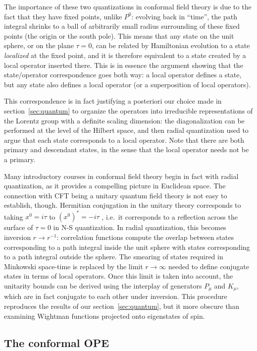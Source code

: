 \documentclass[a4paper,12pt]{article}
\numberwithin{equation}{section}
\begin{document}
The importance of these two quantizations in conformal field theory is due to the fact that they have fixed points, unlike $P^0$: evolving back in ``time'', the path integral shrinks to a ball of arbitrarily small radius surrounding of these fixed points (the origin or the south pole). This means that any state on the unit sphere, or on the plane $\tau = 0$, can be related by Hamiltonian evolution to a state \emph{localized} at the fixed point, and it is therefore equivalent to a state created by a local operator inserted there.
This is in essence the argument showing that the state/operator correspondence goes both way: a local operator defines a state, but any state also defines a local operator (or a superposition of local operators).

This correspondence is in fact justifying a posteriori our choice made in section~\ref{sec:quantum} to organize the operators into irreducible representations of the Lorentz group with a definite scaling dimension: the diagonalization can be performed at the level of the Hilbert space, and then radial quantization used to argue that each state corresponds to a local operator.
Note that there are both primary and descendant states, in the sense that the local operator needs not be a primary.

Many introductory courses in conformal field theory begin in fact with radial quantization, as it provides a compelling picture in Euclidean space. The connection with CFT being a unitary quantum field theory is not easy to establish, though. Hermitian conjugation in the unitary theory corresponds to taking $x^0 = i \tau$ to $(x^0)^* = -i \tau$ , i.e.~it corresponds to a reflection across the surface of $\tau = 0$ in N-S quantization. In radial quantization, this becomes inversion $r \to r^{-1}$: correlation functions compute the overlap between states corresponding to a path integral inside the unit sphere with states corresponding to a path integral outside the sphere. The smearing of states required in Minkowski space-time is replaced by the limit $r \to \infty$ needed to define conjugate states in terms of local operators.
Once this limit is taken into account, the unitarity bounds can be derived using the interplay of generators $P_\mu$ and $K_\mu$, which are in fact conjugate to each other under inversion. This procedure reproduces the results of our section~\ref{sec:quantum}, but it more obscure than examining Wightman functions projected onto eigenstates of spin.


\subsection{The conformal OPE}
\end{document}
